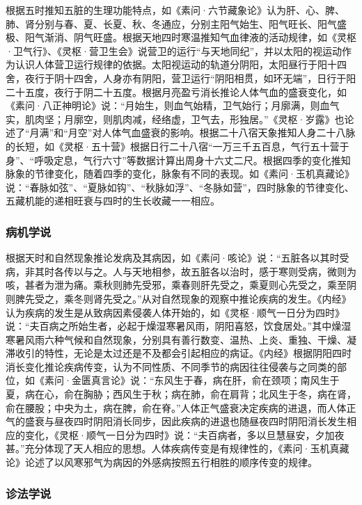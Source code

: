 \documentclass[draft,12pt]{ctexbook}
\begin{document}
根据五时推知五脏的生理功能特点，如《素问·六节藏象论》认为肝、心、脾、肺、肾分别与春、夏、长夏、秋、冬通应，分别主阳气始生、阳气旺长、阳气盛极、阳气渐消、阴气旺盛。根据天地四时寒温推知气血律液的活动规律，如《灵枢·卫气行》、《灵枢·营卫生会》说营卫的运行“与天地同纪”，并以太阳的视运动作为认识人体营卫运行规律的依据。太阳视运动的轨道分阴阳，太阳昼行于阳十四舍，夜行于阴十四舍，人身亦有阴阳，营卫运行“阴阳相贯，如环无端”，日行于阳二十五度，夜行于阴二十五度。根据月亮盈亏消长推论人体气血的盛衰变化，如《素问·八正神明论》说：“月始生，则血气始精，卫气始行；月廓满，则血气实，肌肉坚；月廓空，则肌肉减，经络虚，卫气去，形独居。”《灵枢·岁露》也论述了“月满”和“月空”对人体气血盛衰的影响。根据二十八宿天象推知人身二十八脉的长短，如《灵枢·五十营》根据日行二十八宿“一万三千五百息，气行五十营于身”、“呼吸定息，气行六寸”等数据计算出周身十六丈二尺。根据四季的变化推知脉象的节律变化，随着四季的变化，脉象有不同的表现。如《素问·玉机真藏论》说：“春脉如弦”、“夏脉如钩”、“秋脉如浮”、“冬脉如营”，四时脉象的节律变化、五藏机能的递相旺衰与四时的生长收藏一一相应。

\subsubsection{病机学说}%

根据天时和自然现象推论发病及其病因，如《素问·咳论》说：“五脏各以其时受病，非其时各传以与之。人与天地相参，故五脏各以治时，感于寒则受病，微则为咳，甚者为泄为痛。乘秋则肺先受邪，乘春则肝先受之，乘夏则心先受之，乘至阴则脾先受之，乘冬则肾先受之。”从对自然现象的观察中推论疾病的发生。《内经》认为疾病的发生是从致病因素侵袭人体开始的，如《灵枢·顺气一日分为四时》说：“夫百病之所始生者，必起于燥湿寒暑风雨，阴阳喜怒，饮食居处。”其中燥湿寒暑风雨六种气候和自然现象，分别具有善行数变、温热、上炎、重独、干燥、凝滞收引的特性，无论是太过还是不及都会引起相应的病证。《内经》根据阴阳四时消长变化推论疾病传变，认为不同性质、不同季节的病因往往侵袭与之同类的部位，如《素问·金匮真言论》说：“东风生于春，病在肝，俞在颈项；南风生于夏，病在心，俞在胸胁；西风生于秋；病在肺，俞在肩背；北风生于冬，病在肾，俞在腰股；中央为土，病在脾，俞在脊。”人体正气盛衰决定疾病的进退，而人体正气的盛衰与昼夜四时阴阳消长同步，因此疾病的进退也随昼夜四时阴阳消长发生相应的变化，《灵枢·顺气一日分为四时》说：“夫百病者，多以旦慧昼安，夕加夜甚。”充分体现了天人相应的思想。人体疾病传变是有规律性的，《素问·玉机真藏论》论述了以风寒邪气为病因的外感病按照五行相胜的顺序传变的规律。

\subsubsection{诊法学说}%
\end{document}
